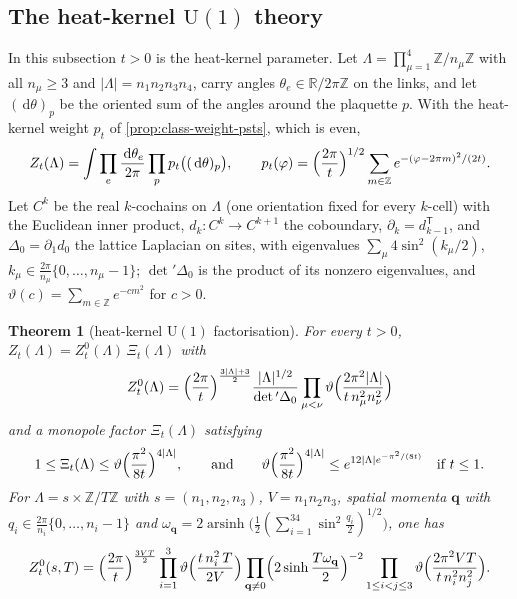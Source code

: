 \documentclass[11pt,a4paper]{amsart}
\newtheorem{theorem}{Theorem}[section]
\theoremstyle{definition}
\theoremstyle{remark}
\numberwithin{equation}{section}
\newcommand{\R}{\mathbb{R}}          %
\newcommand{\Z}{\mathbb{Z}}          %
\newcommand{\abs}[1]{\lvert #1\rvert}      %
\newcommand{\dd}{\,\mathrm{d}}             %
\newcommand{\U}{\mathrm{U}}                %
\begin{document}
\subsection{The heat-kernel \texorpdfstring{$\U(1)$}{U(1)} theory}

In this subsection $t>0$ is the heat-kernel parameter. Let $\Lambda=\prod_{\mu=1}^4\Z/n_\mu\Z$ with all $n_\mu\ge3$ and $\abs{\Lambda}=n_1n_2n_3n_4$, carry angles $\theta_e\in\R/2\pi\Z$ on the links, and let $(\dd\theta)_p$ be the oriented sum of the angles around the plaquette $p$. With the heat-kernel weight $p_t$ of \cref{prop:class-weight-psts}, which is even,
\[
Z_t(\Lambda)=\int\prod_e\frac{\dd\theta_e}{2\pi}\prod_pp_t\bigl((\dd\theta)_p\bigr),\qquad p_t(\varphi)=\Bigl(\frac{2\pi}{t}\Bigr)^{1/2}\sum_{m\in\Z}e^{-(\varphi-2\pi m)^2/(2t)} .
\]
Let $C^k$ be the real $k$-cochains on $\Lambda$ (one orientation fixed for every $k$-cell) with the Euclidean inner product, $d_k\colon C^k\to C^{k+1}$ the coboundary, $\partial_k=d_{k-1}^{\mathsf T}$, and $\Delta_0=\partial_1d_0$ the lattice Laplacian on sites, with eigenvalues $\sum_\mu4\sin^2(k_\mu/2)$, $k_\mu\in\frac{2\pi}{n_\mu}\{0,\dots,n_\mu-1\}$; $\det{}'\Delta_0$ is the product of its nonzero eigenvalues, and $\vartheta(c)=\sum_{m\in\Z}e^{-cm^2}$ for $c>0$.

\begin{theorem}[heat-kernel $\U(1)$ factorisation]\label{thm:heat-kernel}
For every $t>0$, $Z_t(\Lambda)=Z^0_t(\Lambda)\,\Xi_t(\Lambda)$ with
\begin{equation}\label{eq:heat-kernel-free}
Z^0_t(\Lambda)=\Bigl(\frac{2\pi}{t}\Bigr)^{\frac{3\abs{\Lambda}+3}{2}}\frac{\abs{\Lambda}^{1/2}}{\det{}'\Delta_0}\prod_{\mu<\nu}\vartheta\Bigl(\frac{2\pi^2\abs{\Lambda}}{t\,n_\mu^2n_\nu^2}\Bigr)
\end{equation}
and a monopole factor $\Xi_t(\Lambda)$ satisfying
\begin{equation}\label{eq:heat-kernel-monopole}
1\le\Xi_t(\Lambda)\le\vartheta\Bigl(\frac{\pi^2}{8t}\Bigr)^{4\abs{\Lambda}},\qquad\text{and}\qquad \vartheta\Bigl(\frac{\pi^2}{8t}\Bigr)^{4\abs{\Lambda}}\le e^{12\abs{\Lambda}e^{-\pi^2/(8t)}}\quad\text{if }t\le1 .
\end{equation}
For $\Lambda=s\times\Z/T\Z$ with $s=(n_1,n_2,n_3)$, $V=n_1n_2n_3$, spatial momenta $\mathbf q$ with $q_i\in\frac{2\pi}{n_i}\{0,\dots,n_i-1\}$ and $\omega_{\mathbf q}=2\operatorname{arsinh}\bigl(\frac12(\sum_{i=1}^34\sin^2\frac{q_i}{2})^{1/2}\bigr)$, one has
\begin{equation}\label{eq:heat-kernel-product}
Z^0_t(s,T)=\Bigl(\frac{2\pi}{t}\Bigr)^{\frac{3VT}{2}}\prod_{i=1}^3\vartheta\Bigl(\frac{t\,n_i^2\,T}{2V}\Bigr)\prod_{\mathbf q\ne0}\Bigl(2\sinh\frac{T\omega_{\mathbf q}}{2}\Bigr)^{-2}\prod_{1\le i<j\le3}\vartheta\Bigl(\frac{2\pi^2VT}{t\,n_i^2n_j^2}\Bigr).
\end{equation}
\end{theorem}
\end{document}
